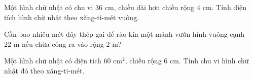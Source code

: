 \begin{ex} %
Một hình chữ nhật có chu vi $36\text{ cm}$, chiều dài hơn chiều rộng $4\text{ cm}$. Tính diện tích hình chữ nhật theo xăng-ti-mét vuông.
\end{ex}

\begin{ex} %
Cần bao nhiêu mét dây thép gai để rào kín một mảnh vườn hình vuông cạnh $22\text{ m}$ nếu chừa cổng ra vào rộng $2\text{ m}$?
\end{ex}

\begin{ex} %
Một hình chữ nhật có diện tích $60\text{ cm}^2$, chiều rộng $6\text{ cm}$. Tính chu vi hình chữ nhật đó theo xăng-ti-mét.
\end{ex}

